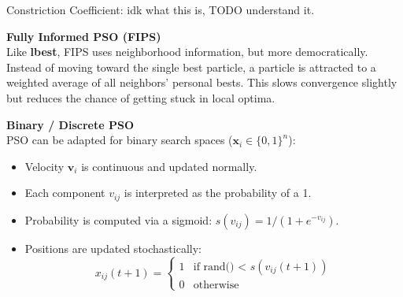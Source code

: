 Constriction Coefficient: idk what this is, TODO understand it.

\textbf{Fully Informed PSO (FIPS)}\\
Like \textbf{lbest}, FIPS uses neighborhood information, but more democratically. 
Instead of moving toward the single best particle, a particle is attracted to a 
weighted average of all neighbors' personal bests. This slows convergence slightly 
but reduces the chance of getting stuck in local optima.

\vspace{0.5em}
\textbf{Binary / Discrete PSO}\\
PSO can be adapted for binary search spaces ($\mathbf{x}_i \in \{0,1\}^n$):
\begin{itemize}
    \item Velocity $\mathbf{v}_i$ is continuous and updated normally.
    \item Each component $v_{ij}$ is interpreted as the probability of a 1.
    \item Probability is computed via a sigmoid: $s(v_{ij}) = 1/(1+e^{-v_{ij}})$.
    \item Positions are updated stochastically:
    \[
        x_{ij}(t+1) = 
        \begin{cases} 
            1 & \text{if rand() < } s(v_{ij}(t+1)) \\ 
            0 & \text{otherwise} 
        \end{cases}
    \]
\end{itemize}
